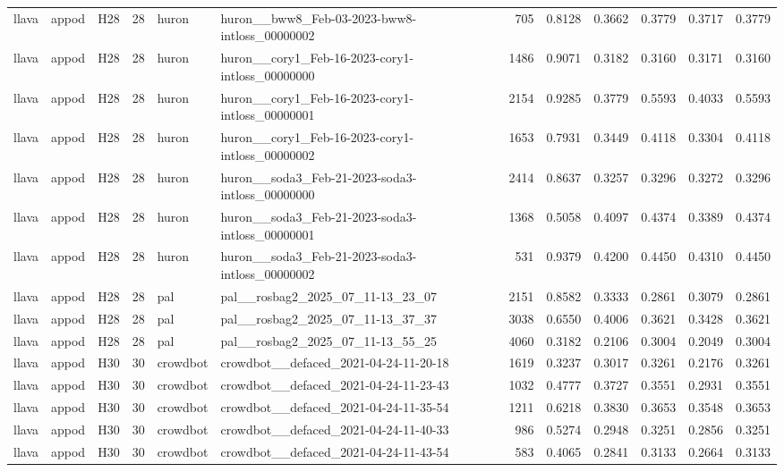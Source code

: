 \begin{table}[tbp]
\begin{tabular}{lllrllrrrrrr}
llava & appod & H28 & 28 & huron & huron\_\_bww8\_Feb-03-2023-bww8-intloss\_00000002 & 705 & 0.8128 & 0.3662 & 0.3779 & 0.3717 & 0.3779 \\
llava & appod & H28 & 28 & huron & huron\_\_cory1\_Feb-16-2023-cory1-intloss\_00000000 & 1486 & 0.9071 & 0.3182 & 0.3160 & 0.3171 & 0.3160 \\
llava & appod & H28 & 28 & huron & huron\_\_cory1\_Feb-16-2023-cory1-intloss\_00000001 & 2154 & 0.9285 & 0.3779 & 0.5593 & 0.4033 & 0.5593 \\
llava & appod & H28 & 28 & huron & huron\_\_cory1\_Feb-16-2023-cory1-intloss\_00000002 & 1653 & 0.7931 & 0.3449 & 0.4118 & 0.3304 & 0.4118 \\
llava & appod & H28 & 28 & huron & huron\_\_soda3\_Feb-21-2023-soda3-intloss\_00000000 & 2414 & 0.8637 & 0.3257 & 0.3296 & 0.3272 & 0.3296 \\
llava & appod & H28 & 28 & huron & huron\_\_soda3\_Feb-21-2023-soda3-intloss\_00000001 & 1368 & 0.5058 & 0.4097 & 0.4374 & 0.3389 & 0.4374 \\
llava & appod & H28 & 28 & huron & huron\_\_soda3\_Feb-21-2023-soda3-intloss\_00000002 & 531 & 0.9379 & 0.4200 & 0.4450 & 0.4310 & 0.4450 \\
llava & appod & H28 & 28 & pal & pal\_\_rosbag2\_2025\_07\_11-13\_23\_07 & 2151 & 0.8582 & 0.3333 & 0.2861 & 0.3079 & 0.2861 \\
llava & appod & H28 & 28 & pal & pal\_\_rosbag2\_2025\_07\_11-13\_37\_37 & 3038 & 0.6550 & 0.4006 & 0.3621 & 0.3428 & 0.3621 \\
llava & appod & H28 & 28 & pal & pal\_\_rosbag2\_2025\_07\_11-13\_55\_25 & 4060 & 0.3182 & 0.2106 & 0.3004 & 0.2049 & 0.3004 \\
llava & appod & H30 & 30 & crowdbot & crowdbot\_\_defaced\_2021-04-24-11-20-18 & 1619 & 0.3237 & 0.3017 & 0.3261 & 0.2176 & 0.3261 \\
llava & appod & H30 & 30 & crowdbot & crowdbot\_\_defaced\_2021-04-24-11-23-43 & 1032 & 0.4777 & 0.3727 & 0.3551 & 0.2931 & 0.3551 \\
llava & appod & H30 & 30 & crowdbot & crowdbot\_\_defaced\_2021-04-24-11-35-54 & 1211 & 0.6218 & 0.3830 & 0.3653 & 0.3548 & 0.3653 \\
llava & appod & H30 & 30 & crowdbot & crowdbot\_\_defaced\_2021-04-24-11-40-33 & 986 & 0.5274 & 0.2948 & 0.3251 & 0.2856 & 0.3251 \\
llava & appod & H30 & 30 & crowdbot & crowdbot\_\_defaced\_2021-04-24-11-43-54 & 583 & 0.4065 & 0.2841 & 0.3133 & 0.2664 & 0.3133 \\

\end{tabular}
\end{table}

